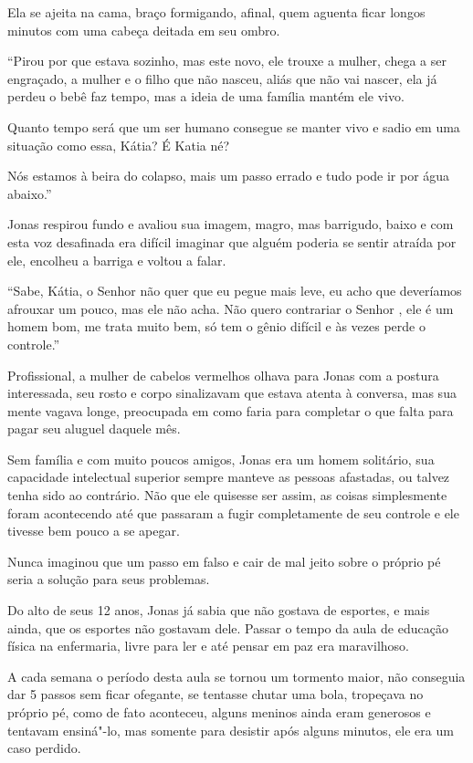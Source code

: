 Ela se ajeita na cama, braço formigando, afinal, quem aguenta ficar
longos minutos com uma cabeça deitada em seu ombro.

``Pirou por que estava sozinho, mas este novo, ele trouxe a mulher, chega
a ser engraçado, a mulher e o filho que não nasceu, aliás que não vai
nascer, ela já perdeu o bebê faz tempo, mas a ideia de uma família
mantém ele vivo.

Quanto tempo será que um ser humano consegue se manter vivo e sadio em
uma situação como essa, Kátia? É Katia né?

Nós estamos à beira do colapso, mais um passo errado e tudo pode ir por
água abaixo.''

Jonas respirou fundo e avaliou sua imagem, magro, mas barrigudo, baixo e
com esta voz desafinada era difícil imaginar que alguém poderia se
sentir atraída por ele, encolheu a barriga e voltou a falar.

``Sabe, Kátia, o Senhor  não quer que eu pegue mais leve, eu acho que
deveríamos afrouxar um pouco, mas ele não acha. Não quero contrariar o
Senhor , ele é um homem bom, me trata muito bem, só tem o gênio difícil
e às vezes perde o controle.''

Profissional, a mulher de cabelos vermelhos olhava para Jonas com a
postura interessada, seu rosto e corpo sinalizavam que estava atenta à
conversa, mas sua mente vagava longe, preocupada em como faria para
completar o que falta para pagar seu aluguel daquele mês.

Sem família e com muito poucos amigos, Jonas era um homem solitário, sua
capacidade intelectual superior sempre manteve as pessoas afastadas, ou
talvez tenha sido ao contrário. Não que ele quisesse ser assim, as
coisas simplesmente foram acontecendo até que passaram a fugir
completamente de seu controle e ele tivesse bem pouco a se apegar.

\asterisc


Nunca imaginou que um passo em falso e cair de mal jeito sobre o próprio
pé seria a solução para seus problemas.

Do alto de seus 12 anos, Jonas já sabia que não gostava de esportes, e
mais ainda, que os esportes não gostavam dele. Passar o tempo da aula de
educação física na enfermaria, livre para ler e até pensar em paz era
maravilhoso.

A cada semana o período desta aula se tornou um tormento maior, não
conseguia dar 5 passos sem ficar ofegante, se tentasse chutar uma bola,
tropeçava no próprio pé, como de fato aconteceu, alguns meninos ainda
eram generosos e tentavam ensiná"-lo, mas somente para desistir após
alguns minutos, ele era um caso perdido.

